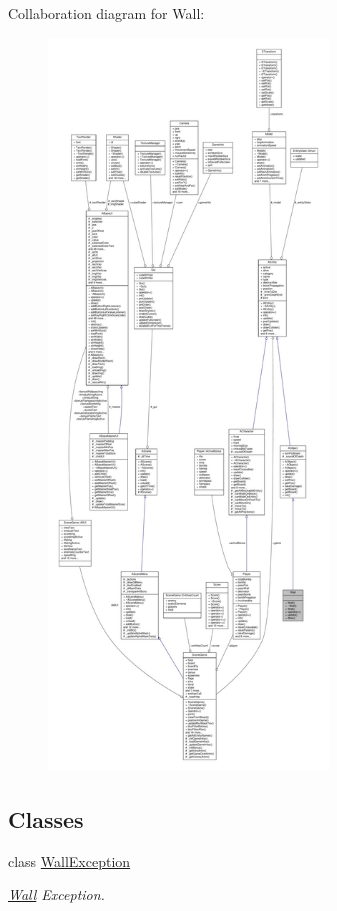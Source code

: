 Collaboration diagram for Wall\+:
\nopagebreak
\begin{figure}[H]
\begin{center}
\leavevmode
\includegraphics[height=550pt]{class_wall__coll__graph}
\end{center}
\end{figure}
\subsection*{Classes}
\begin{DoxyCompactItemize}
\item 
class \hyperlink{class_wall_1_1_wall_exception}{Wall\+Exception}
\begin{DoxyCompactList}\small\item\em \hyperlink{class_wall}{Wall} Exception. \end{DoxyCompactList}\end{DoxyCompactItemize}
